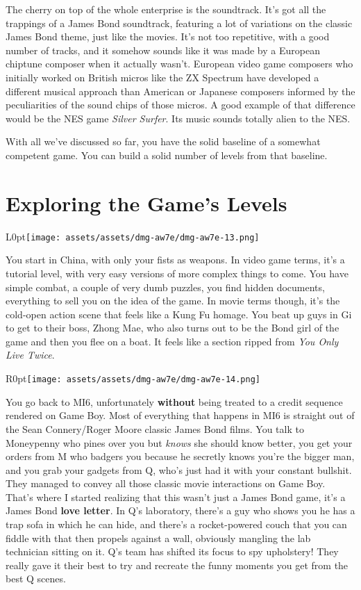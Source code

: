 \documentclass{book}
\begin{document}
The cherry on top of the whole enterprise is the soundtrack. It’s got all the trappings of a James Bond soundtrack, featuring a lot of variations on the classic James Bond theme, just like the movies. It’s not too repetitive, with a good number of tracks, and it somehow sounds like it was made by a European chiptune composer when it actually wasn’t. European video game composers who initially worked on British micros like the ZX Spectrum have developed a different musical approach than American or Japanese composers informed by the peculiarities of the sound chips of those micros. A good example of that difference would be the NES game \emph{Silver Surfer}. Its music sounds totally alien to the NES.\par
With all we’ve discussed so far, you have the solid baseline of a somewhat competent game. You can build a solid number of levels from that baseline.\par
\FloatBarrier\section*{Exploring the Game’s Levels}
\begin{wrapfigure}{L}{0pt}{\texttt{[image: assets/assets/dmg-aw7e/dmg-aw7e-13.png]}}\end{wrapfigure}\noindent
You start in China, with only your fists as weapons. In video game terms, it’s a tutorial level, with very easy versions of more complex things to come. You have simple combat, a couple of very dumb puzzles, you find hidden documents, everything to sell you on the idea of the game. In movie terms though, it’s the cold-open action scene that feels like a Kung Fu homage. You beat up guys in Gi to get to their boss, Zhong Mae, who also turns out to be the Bond girl of the game and then you flee on a boat. It feels like a section ripped from \emph{You Only Live Twice}.\par
\begin{wrapfigure}{R}{0pt}{\texttt{[image: assets/assets/dmg-aw7e/dmg-aw7e-14.png]}}\end{wrapfigure}
You go back to MI6, unfortunately \textbf{without} being treated to a credit sequence rendered on Game Boy. Most of everything that happens in MI6 is straight out of the Sean Connery/Roger Moore classic James Bond films. You talk to Moneypenny who pines over you but \emph{knows} she should know better, you get your orders from M who badgers you because he secretly knows you’re the bigger man, and you grab your gadgets from Q, who’s just had it with your constant bullshit. They managed to convey all those classic movie interactions on Game Boy. That’s where I started realizing that this wasn’t just a James Bond game, it’s a James Bond \textbf{love letter}. In Q’s laboratory, there’s a guy who shows you he has a trap sofa in which he can hide, and there’s a rocket-powered couch that you can fiddle with that then propels against a wall, obviously mangling the lab technician sitting on it. Q’s team has shifted its focus to spy upholstery! They really gave it their best to try and recreate the funny moments you get from the best Q scenes.\par
\end{document}
